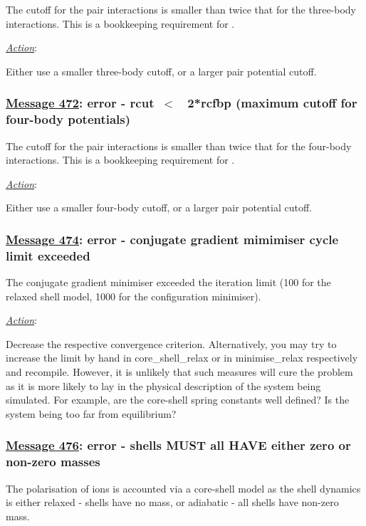 The cutoff for the pair interactions is smaller than twice that
for the three-body interactions. This is a bookkeeping requirement
for \D.

\noindent \underline{\em Action}:

Either use a smaller three-body cutoff, or a larger pair potential
cutoff.

\subsubsection*{\underline{Message 472}: error - rcut~$<$~ 2*rcfbp (maximum cutoff for four-body potentials)}

The cutoff for the pair interactions is smaller than twice that
for the four-body interactions. This is a bookkeeping requirement
for \D.

\noindent \underline{\em Action}:

Either use a smaller four-body cutoff, or a larger pair potential
cutoff.

\subsubsection*{\underline{Message 474}: error - conjugate gradient mimimiser cycle limit exceeded}

The conjugate gradient minimiser exceeded the iteration limit (100 for the relaxed shell model,
1000 for the configuration minimiser).

\noindent \underline{\em Action}:

Decrease the respective convergence criterion.  Alternatively,
you may try to increase the limit by hand in {\sc core\_shell\_relax}
or in {\sc minimise\_relax} respectively and recompile.  However,
it is unlikely that such measures will cure the problem as it is
more likely to lay in the physical description of the system being
simulated.  For example, are the core-shell spring constants well
defined?  Is the system being too far from equilibrium?

\subsubsection*{\underline{Message 476}: error - shells MUST all HAVE either zero or non-zero masses}

The polarisation of ions is accounted via a core-shell model as
the shell dynamics is either relaxed - shells have no mass, or
adiabatic - all shells have non-zero mass.

